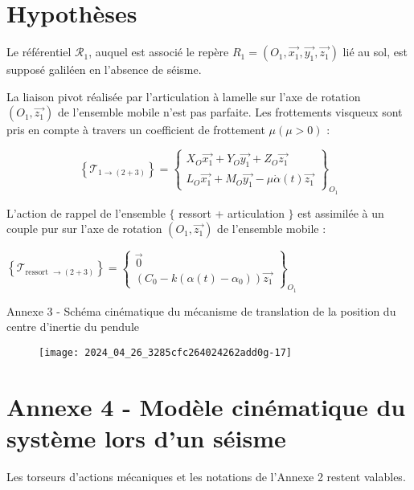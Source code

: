 \section*{Hypothèses}
Le référentiel $\mathcal{R}_{1}$, auquel est associé le repère $R_{1}=\left(O_{1}, \overrightarrow{x_{1}}, \overrightarrow{y_{1}}, \overrightarrow{z_{1}}\right)$ lié au sol, est supposé galiléen en l'absence de séisme.

La liaison pivot réalisée par l'articulation à lamelle sur l'axe de rotation $\left(O_{1}, \overrightarrow{z_{1}}\right)$ de l'ensemble mobile n'est pas parfaite. Les frottements visqueux sont pris en compte à travers un coefficient de frottement $\mu(\mu>0)$ :

$$
\left\{\mathcal{T}_{1 \rightarrow(2+3)}\right\}=\left\{\begin{array}{c}
X_{O} \overrightarrow{x_{1}}+Y_{O} \overrightarrow{y_{1}}+Z_{O} \overrightarrow{z_{1}} \\
L_{O} \overrightarrow{x_{1}}+M_{O} \overrightarrow{y_{1}}-\mu \dot{\alpha}(t) \overrightarrow{z_{1}}
\end{array}\right\}_{O_{1}}
$$

L'action de rappel de l'ensemble $\{$ ressort + articulation $\}$ est assimilée à un couple pur sur l'axe de rotation $\left(O_{1}, \overrightarrow{z_{1}}\right)$ de l'ensemble mobile :

$\left\{\mathcal{T}_{\text {ressort } \rightarrow(2+3)}\right\}=\left\{\begin{array}{c}\overrightarrow{0} \\ \left(C_{0}-k\left(\alpha(t)-\alpha_{0}\right)\right) \overrightarrow{z_{1}}\end{array}\right\}_{O_{1}}$

Annexe 3 - Schéma cinématique du mécanisme de translation de la position du centre d'inertie du pendule

\begin{figure}[!h]
\centering
\texttt{[image: 2024\_04\_26\_3285cfc264024262add0g-17]}
\end{figure}


\section*{Annexe 4 - Modèle cinématique du système lors d'un séisme}
Les torseurs d'actions mécaniques et les notations de l'Annexe 2 restent valables.

